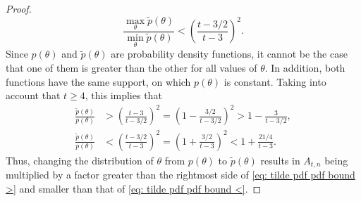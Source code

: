 \documentclass[12pt, a4paper]{article}
\newcommand{\tiles}{t} %
\newcommand{\fdp}{p}
\begin{document}
\begin{proof}
\begin{equation}
\label{eq: max min tilde pdf}
\frac {\max_\theta \tilde \fdp(\theta)} {\min_\theta \tilde \fdp(\theta)} < \left(\frac{\tiles-3/2}{\tiles-3}\right)^2.
\end{equation}
Since $\fdp(\theta)$ and $\tilde\fdp(\theta)$ are probability density functions, it cannot be the case that one of them is greater than the other for all values of $\theta$. In addition, both functions have the same support, on which $\fdp(\theta)$ is constant. Taking into account that $\tiles \geq 4$, this implies that
\begin{align}
\label{eq: tilde pdf pdf bound >}
\frac {\tilde \fdp(\theta)} {\fdp(\theta)} &> \left(\frac{\tiles-3}{\tiles-3/2}\right)^2 = \left(1-\frac{3/2}{\tiles-3/2}\right)^2 > 1 - \frac 3 {\tiles-3/2}, \\
\label{eq: tilde pdf pdf bound <}
\frac {\tilde \fdp(\theta)} {\fdp(\theta)} &< \left(\frac{\tiles-3/2}{\tiles-3}\right)^2 = \left(1+\frac{3/2}{\tiles-3}\right)^2 < 1 + \frac {21/4} {\tiles-3}.
\end{align}
Thus, changing the distribution of $\theta$ from $\fdp(\theta)$ to $\tilde \fdp(\theta)$ results in $A_{\tiles,n}$ being multiplied by a factor greater than the rightmost side of \eqref{eq: tilde pdf pdf bound >} and smaller than that of \eqref{eq: tilde pdf pdf bound <}.


\end{proof}
\end{document}
